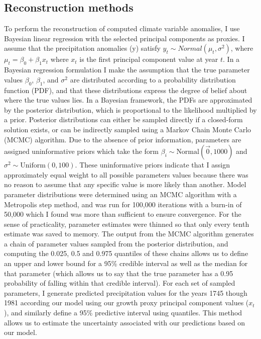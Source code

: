 \subsection{Reconstruction methods}

To perform the reconstruction of computed climate variable anomalies,  I  use Bayesian linear regression with the selected principal components as proxies. I assume that the precipitation anomalies (y) satisfy $y_t \sim Normal( \mu_t, \sigma^2)$, where $\mu_t = \beta_0 + \beta_1 x_t$ where $x_t$ is the first principal component value at year $t$. In a Bayesian regression formulation  I  make the assumption that the true parameter values $\beta_0$, $\beta_1$, and $\sigma^2$ are distributed according to a probability distribution function (PDF), and that these distributions express the degree of belief about where the true values lies. In a Bayesian framework, the PDFs are approximated by the posterior distribution, which is proportional to the likelihood multiplied by a prior. Posterior distributions can either be sampled directly if a closed-form solution exists, or can be indirectly sampled using a Markov Chain Monte Carlo (MCMC)\label{sym:MCMC} algorithm. Due to the absence of prior information, parameters are assigned uninformative priors which take the form $\beta_i \sim \text{Normal}(\vec{0},1000)$ and $\sigma^2 \sim \text{Uniform}(0,100)$. These uninformative priors indicate that I assign approximately equal weight to all possible parameters values because there was no reason to assume that any specific value is more likely than another. Model parameter distributions were determined using an MCMC algorithm with a Metropolis step method, and was run for 100,000 iterations with a burn-in of 50,000 which I found was more than sufficient to ensure convergence. For the sense of practicality, parameter estimates were thinned so that only every tenth estimate was saved to memory. The output from the MCMC algorithm generates a chain of parameter values sampled from the posterior distribution, and computing the 0.025, 0.5 and 0.975 quantiles of these chains allows us to define an upper and lower bound for a 95\% credible interval as well as the median for that parameter (which allows us to say that the true parameter has a 0.95 probability of falling within that credible interval). For each set of sampled parameters, I generate predicted precipitation values for the years 1745 though 1981 according our model using our growth proxy principal component values ($x_t$), and similarly define a 95\% predictive interval using quantiles. This method allows us to estimate the uncertainty associated with our predictions based on our model. 

